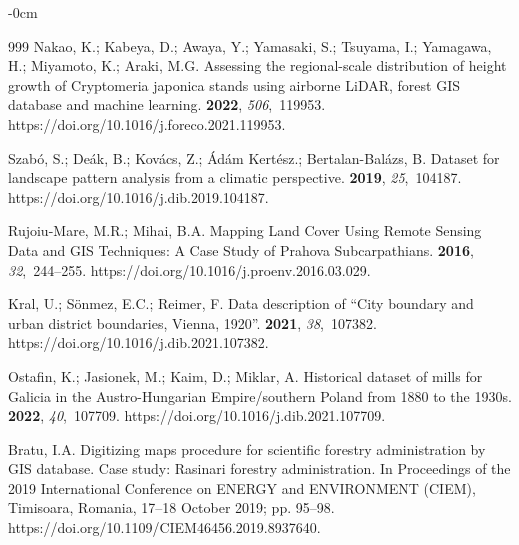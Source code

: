 \documentclass[data,article,accept,pdftex,moreauthors]{Definitions/mdpi}
\begin{document}
{\begin{adjustwidth}{-\extralength}{0cm}
\begin{thebibliography}{999}
Nakao, K.; Kabeya, D.; Awaya, Y.; Yamasaki, S.; Tsuyama, I.; Yamagawa, H.;
 Miyamoto, K.; Araki, M.G.
\newblock Assessing the regional-scale distribution of height growth of
 Cryptomeria japonica stands using airborne LiDAR, forest GIS database and
 machine learning.
 {\bf 2022}, {\em 506},~119953.
https://doi.org/10.1016/j.foreco.2021.119953.

Szabó, S.; Deák, B.; Kovács, Z.; Ádám Kertész.; Bertalan-Balázs, B.
\newblock Dataset for landscape pattern analysis from a climatic perspective.
 {\bf 2019}, {\em 25},~104187.
https://doi.org/10.1016/j.dib.2019.104187.

Rujoiu-Mare, M.R.; Mihai, B.A.
\newblock Mapping Land Cover Using Remote Sensing Data and GIS Techniques: A
 Case Study of Prahova Subcarpathians.
 {\bf 2016}, {\em 32},~244--255. https://doi.org/10.1016/j.proenv.2016.03.029. %


Kral, U.; Sönmez, E.C.; Reimer, F.
\newblock Data description of “City boundary and urban district boundaries,
 Vienna, 1920”.
 {\bf 2021}, {\em 38},~107382.
https://doi.org/10.1016/j.dib.2021.107382.

Ostafin, K.; Jasionek, M.; Kaim, D.; Miklar, A.
\newblock Historical dataset of mills for Galicia in the Austro-Hungarian
 Empire/southern Poland from 1880 to the 1930s.
 {\bf 2022}, {\em 40},~107709.
https://doi.org/10.1016/j.dib.2021.107709.

Bratu, I.A.
\newblock Digitizing maps procedure for scientific forestry administration by
 GIS database. Case study: Rasinari forestry administration.
\newblock In Proceedings of the 2019 International Conference on ENERGY and
 ENVIRONMENT (CIEM), Timisoara, Romania, 17--18 October 2019; pp. 95--98.
https://doi.org/10.1109/CIEM46456.2019.8937640.


\end{thebibliography}
\end{adjustwidth}}
\end{document}
